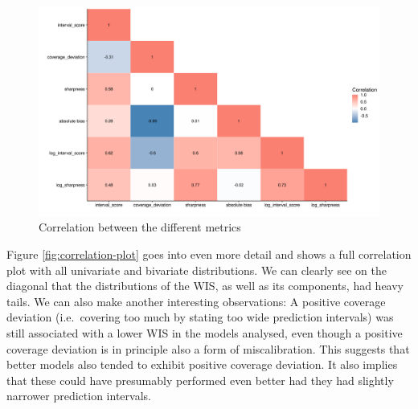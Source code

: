\documentclass[
]{book}
\begin{document}
\begin{figure}

{\centering \includegraphics[width=1\linewidth]{../visualisation/chapter-5-results/scenario-baseline/correlation-map} 

}

\caption{Correlation between the different metrics }\label{fig:correlation-map}
\end{figure}

Figure \ref{fig:correlation-plot} goes into even more detail and shows a full correlation plot with all univariate and bivariate distributions. We can clearly see on the diagonal that the distributions of the WIS, as well as its components, had heavy tails. We can also make another interesting observations: A positive coverage deviation (i.e.~covering too much by stating too wide prediction intervals) was still associated with a lower WIS in the models analysed, even though a positive coverage deviation is in principle also a form of miscalibration. This suggests that better models also tended to exhibit positive coverage deviation. It also implies that these could have presumably performed even better had they had slightly narrower prediction intervals.
\end{document}
